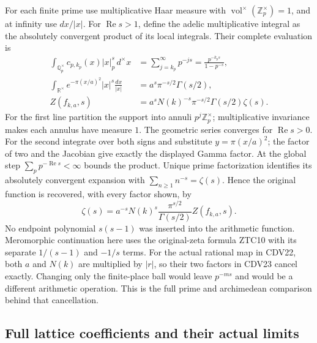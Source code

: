For each finite prime use multiplicative Haar measure with
$\operatorname{vol}^{\times}(\mathbb Z_p^\times)=1$, and at
infinity use $dx/|x|$. For $\operatorname{Re}s>1$, define the
adelic multiplicative integral as the absolutely convergent product
of its local integrals. Their complete evaluation is
\begin{equation}\tag{CDV23}
\begin{split}
 \int_{\mathbb Q_p^\times}c_{p,k_p}(x)|x|_p^s\,d^\times x
   &=\sum_{j=k_p}^\infty p^{-js}
     =\frac{p^{-k_ps}}{1-p^{-s}},\\
 \int_{\mathbb R^\times}e^{-\pi(x/a)^2}|x|^s\frac{dx}{|x|}
   &=a^s\pi^{-s/2}\Gamma(s/2),\\
 Z(f_{k,a},s)
   &=a^sN(k)^{-s}\pi^{-s/2}\Gamma(s/2)\zeta(s).
\end{split}
\end{equation}
For the first line partition the support into annuli
$p^j\mathbb Z_p^\times$; multiplicative invariance makes each
annulus have measure $1$. The geometric series converges for
$\operatorname{Re}s>0$. For the second integrate over both signs
and substitute $y=\pi(x/a)^2$; the factor of two and the
Jacobian give exactly the displayed Gamma factor. At the global
step $\sum_pp^{-\operatorname{Re}s}<\infty$ bounds the product.
Unique prime factorization identifies its absolutely convergent
expansion with $\sum_{n\ge1}n^{-s}=\zeta(s)$. Hence the original
function is recovered, with every factor shown, by
\begin{equation}\tag{CDV24}
 \zeta(s)=a^{-s}N(k)^s\frac{\pi^{s/2}}{\Gamma(s/2)}
                         Z(f_{k,a},s).
\end{equation}
No endpoint polynomial $s(s-1)$ was inserted into the arithmetic
function. Meromorphic continuation here uses the original-zeta
formula ZTC10 with its separate $1/(s-1)$ and $-1/s$ terms.
For the actual rational map in CDV22, both $a$ and $N(k)$ are
multiplied by $|r|$, so their two factors in CDV23 cancel exactly.
Changing only the finite-place ball would leave $p^{-ms}$ and
would be a different arithmetic operation. This is the full prime
and archimedean comparison behind that cancellation.

\subsection{Full lattice coefficients and their actual limits}


